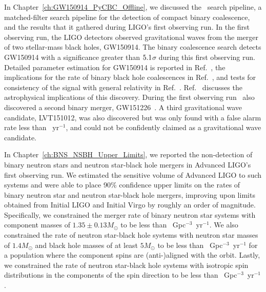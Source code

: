 
In Chapter~\ref{ch:GW150914_PyCBC_Offline}, we discussed the \pycbc{}\ search pipeline, a matched-filter
search pipeline for the detection of compact binary coalescence, and the results
that it gathered during LIGO's first observing run. In the first observing run, the LIGO detectors observed
gravitational waves from the merger of two
stellar-mass black holes, GW150914. The binary coalescence search detects GW150914 with
a significance greater than $5.1$$\sigma$ during this first observing
run. Detailed parameter estimation for
GW150914 is reported in Ref.~\cite{GW150914-PARAMESTIM}, the implications for
the rate of binary black hole coalescences in Ref.~\cite{GW150914-RATES}, and
tests for consistency of the signal with general relativity in
Ref.~\cite{GW150914-TESTOFGR}.  Ref.~\cite{GW150914-ASTRO} discusses the
astrophysical implications of this discovery. During the first observing run
\pycbc{}\ also discovered a second binary merger, GW151226~\cite{Abbott:2016nmj}. A third
gravitational wave candidate, LVT151012, was also discovered but was only found
with a false alarm rate less than \CBCSECONDEVENTFAR~$\text{yr}^{-1}$, and could not be
confidently claimed as a gravitational wave candidate.

In Chapter~\ref{ch:BNS_NSBH_Upper_Limits}, we reported the non-detection of binary neutron stars and neutron star-black hole mergers
in Advanced \ac{LIGO}'s first observing run.
We estimated the sensitive volume of Advanced \ac{LIGO} to such systems and were able to place 90\%
confidence upper limits on the rates of binary neutron star and neutron star-black hole mergers, improving upon limits
obtained from Initial \ac{LIGO} and Initial Virgo by roughly an order of magnitude.
Specifically, we constrained the merger rate of binary neutron star systems with component masses of $1.35\pm0.13M_{\odot}$
to be less than \MainBNSULPyCBCHighSpin~Gpc$^{-3}$~yr$^{-1}$. We also constrained
the rate of neutron star-black hole systems with neutron star masses of $1.4 M_\odot$ and black hole masses
of at least $5 M_{\odot}$ to be less than \MainNSBHULPyCBCFiveAligned~Gpc$^{-3}$~yr$^{-1}$
for a population where the component spins are (anti-)aligned with
the orbit. Lastly, we constrained the rate of neutron star-black hole systems with isotropic spin distributions in the
components of the spin direction to be less than \MainNSBHULPyCBCFiveIso~Gpc$^{-3}$~yr$^{-1}$.

